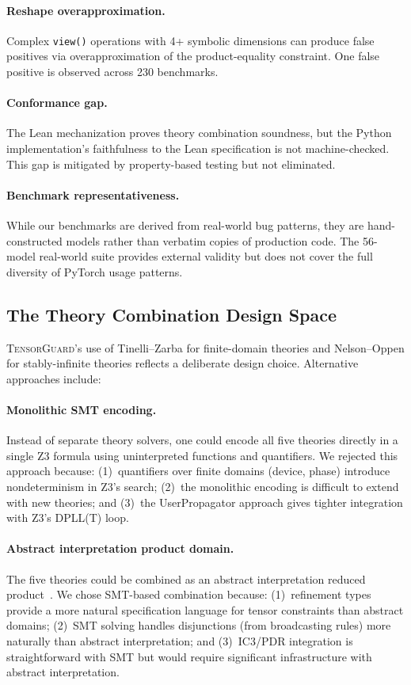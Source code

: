\documentclass[10pt]{article}
\newcommand{\tguard}{\textsc{TensorGuard}}
\theoremstyle{plain}
\theoremstyle{definition}
\theoremstyle{remark}
\begin{document}
\paragraph{Reshape overapproximation.}
Complex \texttt{view()} operations with 4+ symbolic dimensions can
produce false positives via overapproximation of the product-equality
constraint.  One false positive is observed across 230 benchmarks.

\paragraph{Conformance gap.}
The Lean mechanization proves theory combination soundness, but
the Python implementation's faithfulness to the Lean specification
is not machine-checked.  This gap is mitigated by property-based
testing but not eliminated.

\paragraph{Benchmark representativeness.}
While our benchmarks are derived from real-world bug patterns, they
are hand-constructed models rather than verbatim copies of production
code.  The 56-model real-world suite provides external validity but
does not cover the full diversity of PyTorch usage patterns.

\subsection{The Theory Combination Design Space}

\tguard{}'s use of Tinelli--Zarba for finite-domain theories and
Nelson--Oppen for stably-infinite theories reflects a deliberate
design choice.  Alternative approaches include:

\paragraph{Monolithic SMT encoding.}
Instead of separate theory solvers, one could encode all five
theories directly in a single Z3 formula using uninterpreted
functions and quantifiers.  We rejected this approach because:
(1)~quantifiers over finite domains (device, phase) introduce
nondeterminism in Z3's search; (2)~the monolithic encoding is
difficult to extend with new theories; and (3)~the UserPropagator
approach gives tighter integration with Z3's DPLL(T) loop.

\paragraph{Abstract interpretation product domain.}
The five theories could be combined as an abstract interpretation
reduced product~\cite{cousot79}.  We chose SMT-based combination
because: (1)~refinement types provide a more natural specification
language for tensor constraints than abstract domains;
(2)~SMT solving handles disjunctions (from broadcasting rules)
more naturally than abstract interpretation; and (3)~IC3/PDR
integration is straightforward with SMT but would require
significant infrastructure with abstract interpretation.
\end{document}
